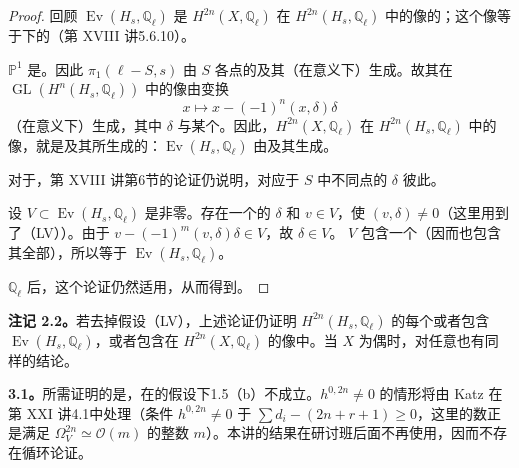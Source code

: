 \begin{proof}
回顾 $\operatorname{Ev}(H_{s},\mathbb Q_\ell)$ 是 $H^{2n}(X,\mathbb Q_\ell)$ 在 $H^{2n}(H_{s},\mathbb Q_\ell)$ 中的像的；这个像等于下的（第 XVIII 讲5.6.10）。

 $\mathbb P^1$ 是。因此 $\pi_1(\ell-S,s)$ 由 $S$ 各点的及其（在意义下）生成。故其在 $\operatorname{GL}(H^n(H_{s},\mathbb Q_\ell))$ 中的像由变换
\[
x\longmapsto x-(-1)^n(x,\delta)\delta
\]
（在意义下）生成，其中 $\delta$ 与某个。因此，$H^{2n}(X,\mathbb Q_\ell)$ 在 $H^{2n}(H_{s},\mathbb Q_\ell)$ 中的像，就是及其所生成的：$\operatorname{Ev}(H_{s},\mathbb Q_\ell)$ 由及其生成。

对于，第 XVIII 讲第6节的论证仍说明，对应于 $S$ 中不同点的 $\delta$ 彼此。

设 $V\subset\operatorname{Ev}(H_{s},\mathbb Q_\ell)$ 是非零。存在一个的 $\delta$ 和 $v\in V$，使 $(v,\delta)\ne0$（这里用到了（LV））。由于 $v-(-1)^m(v,\delta)\delta\in V$，故 $\delta\in V$。 $V$ 包含一个（因而也包含其全部），所以等于 $\operatorname{Ev}(H_{s},\mathbb Q_\ell)$。

 $\mathbb Q_\ell$ 后，这个论证仍然适用，从而得到。
\end{proof}

\textbf{注记 2.2。}若去掉假设（LV），上述论证仍证明 $H^{2n}(H_{s},\mathbb Q_\ell)$ 的每个或者包含 $\operatorname{Ev}(H_{s},\mathbb Q_\ell)$，或者包含在 $H^{2n}(X,\mathbb Q_\ell)$ 的像中。当 $X$ 为偶时，对任意也有同样的结论。

\textbf{3.1。}所需证明的是，在的假设下1.5（b）不成立。$h^{0,2n}\ne0$ 的情形将由 Katz 在第 XXI 讲4.1中处理（条件 $h^{0,2n}\ne0$ 于 $\sum d_i-(2n+r+1)\geq0$，这里的数正是满足 $\Omega_V^{2n}\simeq\mathcal O(m)$ 的整数 $m$）。本讲的结果在研讨班后面不再使用，因而不存在循环论证。

